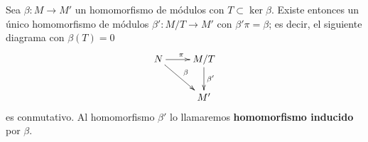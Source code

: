 \begin{proposicion}
	 \label{prop:teo-fact} Sea $\beta: M \rightarrow M'$
	un homomorfismo de módulos con $T \subset \ker \beta$. Existe entonces un
	único homomorfismo de módulos $\beta': M/T \rightarrow M'$ con
	$\beta'\pi = \beta$; es decir, el siguiente diagrama con $\beta(T) = 0$
	\begin{equation}
		\label{firstisothm}\xymatrix{ N \ar[r]^\pi \ar[dr]^\beta & M/T \ar[d]^{\beta'} \\ & M' }
	\end{equation}
	es conmutativo. Al homomorfismo $\beta'$ lo llamaremos \textbf{homomorfismo
		inducido} por $\beta$.
\end{proposicion}
%
%

